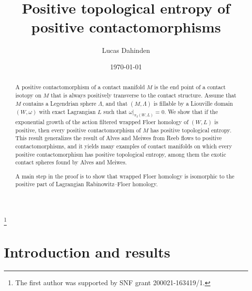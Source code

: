 \documentclass{amsart}
\theoremstyle{definition}
\theoremstyle{remark}
\numberwithin{equation}{section}
\begin{document}
\title[]{Positive topological entropy of positive contactomorphisms}

\author{Lucas Dahinden}
\address{Universit\'e de Neuch\^atel (UNINE)}
\thanks{The first author was supported by SNF grant 200021-163419/1.}


\date{\today}

\begin{abstract}
A positive contactomorphism of a contact manifold $M$ is the end point of a contact isotopy on $M$ that is always positively transverse to the contact structure. 
Assume that $M$ contains a Legendrian sphere $\Lambda$, and that $(M,\Lambda)$ is fillable by a Liouville domain $(W,\omega)$ with exact Lagrangian $L$ such that $\omega|_{\pi_2(W,L)}=0$. 
We show that if the exponential growth of the action filtered wrapped Floer homology of $(W,L)$ is positive, then every positive contactomorphism of $M$ has positive topological entropy. This result generalizes the result of Alves and Meiwes from Reeb flows to positive contactomorphisms, and it yields many examples of contact manifolds on which every positive contactomorphism has positive topological entropy, among them the exotic contact spheres found by Alves and Meiwes.
	
	A main step in the proof is to show that wrapped Floer homology is isomorphic to the positive part of Lagrangian Rabinowitz--Floer homology. 
\end{abstract}

\maketitle

\section{Introduction and results}\label{sec:intro}
\end{document}
